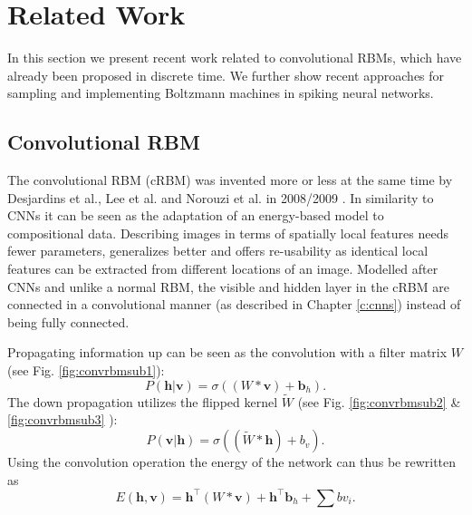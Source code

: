 \chapter{Related Work} \label{c:relwork}

In this section we present recent work related to convolutional RBMs, which have already been proposed in discrete time.
We further show recent approaches for sampling and implementing Boltzmann machines in spiking neural networks.

\section{Convolutional RBM} \label{c:convrbm}

The convolutional RBM (cRBM) was invented more or less at the same time by Desjardins et al., Lee et al. and Norouzi et al. in 2008/2009 \cite{desjardins2008empirical, lee2009convolutional, norouzi2009stacks}. 
In similarity to CNNs it can be seen as the adaptation of an energy-based model to compositional data.
Describing images in terms of spatially local features needs fewer parameters, generalizes better and offers re-usability as identical local features can be extracted from different locations of an image.
Modelled after CNNs and unlike a normal RBM, the visible and hidden layer in the cRBM are connected in a convolutional manner (as described in Chapter \ref{c:cnns}) instead of being fully connected.


Propagating information up can be seen as the convolution with a filter matrix $W$ (see Fig. \ref{fig:convrbmsub1}): 
\[
P(\textbf{h} | \textbf{v}) = \sigma((W * \textbf{v}) + \textbf{b}_{h}).
\]
The down propagation utilizes the flipped kernel $\tilde{W}$  (see Fig. \ref{fig:convrbmsub2} \& \ref{fig:convrbmsub3} ):
\[
P(\textbf{v}| \textbf{h}) = \sigma((\tilde{W} * \textbf{h}) + b_v).
\]
Using the convolution operation the energy of the network can thus be rewritten as
\[
E(\textbf{h} , \textbf{v}) = \textbf{h}^\intercal(W * \textbf{v}) + \textbf{h}^\intercal \textbf{b}_{h} + \sum b v_i.
\]



